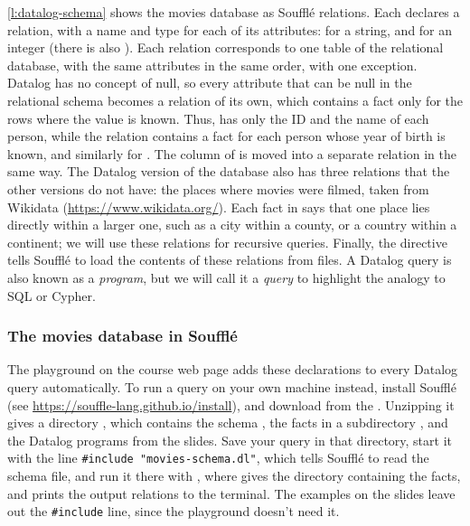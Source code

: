 \autoref{l:datalog-schema} shows the movies database as Soufflé relations.
Each  declares a relation, with a name and type for each of its attributes:  for a string, and  for an integer (there is also ).
Each relation corresponds to one table of the relational database, with the same attributes in the same order, with one exception.
Datalog has no concept of null, so every attribute that can be null in the relational schema becomes a relation of its own, which contains a fact only for the rows where the value is known.
Thus,  has only the ID and the name of each person, while the  relation contains a fact for each person whose year of birth is known, and similarly for .
The  column of  is moved into a separate  relation in the same way.
The Datalog version of the database also has three relations that the other versions do not have: the places where movies were filmed, taken from Wikidata (\url{https://www.wikidata.org/}).
Each fact in  says that one place lies directly within a larger one, such as a city within a county, or a country within a continent; we will use these relations for recursive queries.
Finally, the  directive tells Soufflé to load the contents of these relations from files.
A Datalog query is also known as a \emph{program}, but we will call it a \emph{query} to highlight the analogy to SQL or Cypher.

\begin{frame}
    \label{s:datalog-schema}
    \frametitle{The movies database in Soufflé}
\end{frame}
\label{l:datalog-schema}

The playground on the course web page adds these declarations to every Datalog query automatically.
To run a query on your own machine instead, install Soufflé (see \url{https://souffle-lang.github.io/install}), and download  from the \materialspage{}.
Unzipping it gives a directory , which contains the schema , the facts in a subdirectory , and the Datalog programs from the slides.
Save your query in that directory, start it with the line \texttt{\#include "movies-schema.dl"}, which tells Soufflé to read the schema file, and run it there with , where  gives the directory containing the facts, and  prints the output relations to the terminal.
The examples on the slides leave out the \texttt{\#include} line, since the playground doesn't need it.


